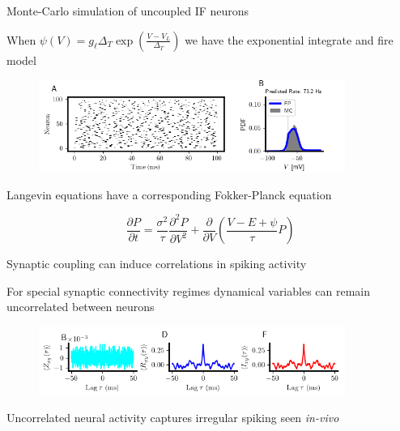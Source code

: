 \documentclass{beamer}					%
\begin{document}
\begin{frame}{Monte-Carlo simulation of uncoupled IF neurons}

When $\psi(V) = g_{\ell}\Delta_{T}\exp\left(\frac{V-V_{L}}{\Delta_{T}}\right)$ we have the exponential integrate and fire model

\begin{figure}
\centering
\includegraphics[width=100mm]{figure-3-1}
\end{figure}

Langevin equations have a corresponding Fokker-Planck equation 

\begin{equation*}
\frac{\partial P}{\partial t} = \frac{\sigma^{2}}{\tau}\frac{\partial^{2}P}{\partial V^{2}} + \frac{\partial}{\partial V}\left(\frac{V-E+\psi}{\tau}P\right)
\end{equation*}

\end{frame}


\begin{frame}{Synaptic coupling can induce correlations in spiking activity}

For special synaptic connectivity regimes dynamical variables can remain uncorrelated between neurons

\begin{figure}
\centering
\includegraphics[width=100mm]{figure-12-1}
\end{figure}

Uncorrelated neural activity captures irregular spiking seen \emph{in-vivo}

\end{frame}
\end{document}
